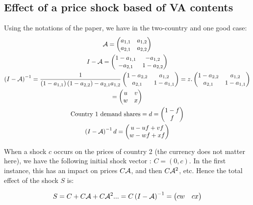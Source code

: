\documentclass[11pt,a4paper]{article}
\begin{document}
\subsection{Effect of a price shock based of VA contents}
Using the notations of the paper, we have in the two-country and one good case:
\begin{gather*}
\cal {A} = \left(\begin{matrix}a_{1,1}&a_{1,2}\\a_{2,1}&a_{2,2}\end{matrix}\right)
\\
I-\cal {A}=\left(\begin{matrix}1-a_{1,1}&-a_{1,2}\\-a_{2,1}&1-a_{2,2}\end{matrix}\right)
\\
\left(I-\cal {A}\right)^{-1}=\frac{1}{\left(1-a_{1,1}\right)\left(1-a_{2,2}\right)-a_{2,1}a_{1,2}}\left(\begin{matrix}1-a_{2,2}&a_{1,2}\\a_{2,1}&1-a_{1,1}\end{matrix}\right) =z.\left(\begin{matrix}1-a_{2,2}&a_{1,2}\\a_{2,1}&1-a_{1,1}\end{matrix}\right) \\ 
=\left(\begin{matrix}u&v\\w&x\end{matrix}\right)
\\
\text{Country 1 demand shares}=d=\left(\begin{matrix}1-f\\f\end{matrix}\right) \\
\left(I-\cal {A}\right)^{-1}d=\left(\begin{matrix}u-uf+vf\\w-wf+xf\end{matrix}\right)
\end{gather*}

When a shock $c$ occurs on the prices of country 2 (the currency does not matter here), we have the following initial shock vector : $C=\left(0,c\right)$.
In the first instance, this has an impact on prices $C\cal {A}$, and then $C{\cal{A}}^{2}$, etc.
Hence the total effect of the shock $S$ is: 


\begin{equation*}
S=C+C{\cal{A}}+C{\cal{A}}^{2}...=C\left(I-{\cal{A}}\right)^{-1}=\left(\begin{matrix}cw  &   cx\end{matrix}\right)
\end{equation*}
\end{document}
